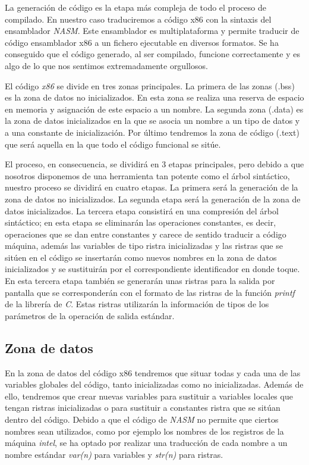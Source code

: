 \documentclass[a4paper,10pt]{article}
\begin{document}
La generación de código es la etapa más compleja de todo el proceso de compilado. En nuestro caso traduciremos a código x86 con la sintaxis del ensamblador \textit{NASM}. Este ensamblador es multiplataforma y permite traducir de código ensamblador x86 a un fichero ejecutable en diversos formatos. Se ha conseguido que el código generado, al ser compilado, funcione correctamente y es algo de lo que nos sentimos extremadamente orgullosos.

El código \textit{x86} se divide en tres zonas principales. La primera de las zonas (.bss) es la zona de datos no inicializados. En esta zona se realiza una reserva de espacio en memoria y asignación de este espacio a un nombre. La segunda zona (.data) es la zona de datos inicializados en la que se asocia un nombre a un tipo de datos y a una constante de inicialización. Por último tendremos la zona de código (.text) que será aquella en la que todo el código funcional se sitúe.

El proceso, en consecuencia, se dividirá en 3 etapas principales, pero debido a que nosotros disponemos de una herramienta tan potente como el árbol sintáctico, nuestro proceso se dividirá en cuatro etapas. La primera será la generación de la zona de datos no inicializados. La segunda etapa será la generación de la zona de datos inicializados. La tercera etapa consistirá en una compresión del árbol sintáctico; en esta etapa se eliminarán las operaciones constantes, es decir, operaciones que se dan entre constantes y carece de sentido traducir a código máquina, además las variables de tipo ristra inicializadas y las ristras que se sitúen en el código se insertarán como nuevos nombres en la zona de datos inicializados y se sustituirán por el correspondiente identificador en donde toque. En esta tercera etapa también se generarán unas ristras para la salida por pantalla que se corresponderán con el formato de las ristras de la función \textit{printf} de la librería de \textit{C}. Estas ristras utilizarán la información de tipos de los parámetros de la operación de salida estándar.

\subsection{Zona de datos}
En la zona de datos del código x86 tendremos que situar todas y cada una de las variables globales del código, tanto inicializadas como no inicializadas. Además de ello, tendremos que crear nuevas variables para sustituir a variables locales que tengan ristras inicializadas o para sustituir a constantes ristra que se sitúan dentro del código. Debido a que el código de \textit{NASM} no permite que ciertos nombres sean utilizados, como por ejemplo los nombres de los registros de la máquina \textit{intel}, se ha optado por realizar una traducción de cada nombre a un nombre estándar \emph{var(n)} para variables y \emph{str(n)} para ristras. 
\end{document}
